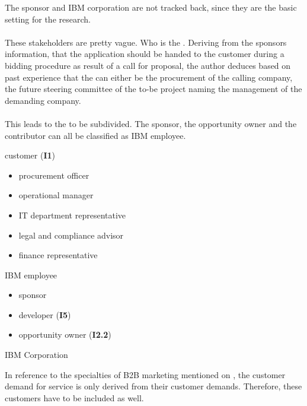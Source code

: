 The sponsor and IBM corporation are not tracked back, since they are the basic setting for the research.

\paragraph{} These stakeholders are pretty vague. Who is the . Deriving from the sponsors information, that the application should be handed to the customer during a bidding procedure as result of a call for proposal, the author deduces based on past experience that the  can either be the procurement of the calling company, the future steering committee of the to-be project naming the management of the demanding company. 

\paragraph{} This leads to the  to be subdivided. The sponsor, the opportunity owner and the contributor can all be classified as IBM employee.

\begin{closeItemCol}
    \item customer (\textbf{I1})
    \begin{itemize}
        \item procurement officer
        \item operational manager
        \item IT department representative
        \item legal and compliance advisor
        \item finance representative
    \end{itemize} \columnbreak
    
    \item IBM employee 
    \begin{itemize}
        \item sponsor
        \item developer (\textbf{I5})
        \item opportunity owner (\textbf{I2.2})
    \end{itemize}
    \item IBM Corporation
\end{closeItemCol}

In reference to the specialties of B2B marketing mentioned on \cpageref{}, the customer demand for service is only derived from their customer demands. Therefore, these customers have to be included as well. 

